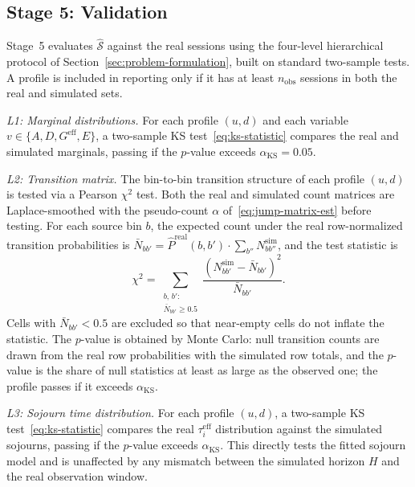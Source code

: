 \documentclass[journal]{IEEEtran}
\begin{document}
\subsection{Stage 5: Validation}
\label{subsec:stage5}

Stage~5 evaluates $\hat{\mathcal{S}}$ against the real sessions using the four-level hierarchical protocol of Section~\ref{sec:problem-formulation}, built on standard two-sample tests. A profile is included in reporting only if it has at least $n_{\mathrm{obs}}$ sessions in both the real and simulated sets.

\emph{L1: Marginal distributions.} For each profile $(u,d)$ and each variable $v \in \{A, D, G^{\mathrm{eff}}, E\}$, a two-sample KS test~\eqref{eq:ks-statistic} compares the real and simulated marginals, passing if the $p$-value exceeds $\alpha_{\mathrm{KS}} = 0.05$.

\emph{L2: Transition matrix.} The bin-to-bin transition structure of each profile $(u,d)$ is tested via a Pearson $\chi^2$ test. Both the real and simulated count matrices are Laplace-smoothed with the pseudo-count $\alpha$ of~\eqref{eq:jump-matrix-est} before testing. For each source bin $b$, the expected count under the real row-normalized transition probabilities is $\bar{N}_{bb'} = \hat{P}^{\mathrm{real}}(b, b') \cdot \sum_{b''} N_{bb''}^{\mathrm{sim}}$, and the test statistic is
\begin{equation}
    \chi^2 = \sum_{\substack{b,\, b':\\ \bar{N}_{bb'} \geq 0.5}}
    \frac{\left(N_{bb'}^{\mathrm{sim}} - \bar{N}_{bb'}\right)^2}
         {\bar{N}_{bb'}}.
    \label{eq:l2-chi2}
\end{equation}
Cells with $\bar{N}_{bb'} < 0.5$ are excluded so that near-empty cells do not inflate the statistic. The $p$-value is obtained by Monte Carlo: null transition counts are drawn from the real row probabilities with the simulated row totals, and the $p$-value is the share of null statistics at least as large as the observed one; the profile passes if it exceeds $\alpha_{\mathrm{KS}}$.

\emph{L3: Sojourn time distribution.} For each profile $(u, d)$, a two-sample KS test~\eqref{eq:ks-statistic} compares the real $\tau_i^{\mathrm{eff}}$ distribution against the simulated sojourns, passing if the $p$-value exceeds $\alpha_{\mathrm{KS}}$. This directly tests the fitted sojourn model and is unaffected by any mismatch between the simulated horizon $H$ and the real observation window.
\end{document}
